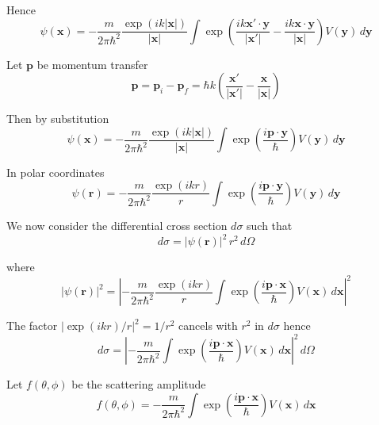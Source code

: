 Hence
\begin{equation*}
\psi(\mathbf x)=-\frac{m}{2\pi\hbar^2}\frac{\exp(ik|\mathbf x|)}{|\mathbf x|}
\int\exp\left(\frac{ik\mathbf x'\cdot\mathbf y}{|\mathbf x'|}
-\frac{ik\mathbf x\cdot\mathbf y}{|\mathbf x|}\right)
V(\mathbf y)\,d\mathbf y
\end{equation*}

Let $\mathbf p$ be momentum transfer
\begin{equation*}
\mathbf p=\mathbf p_i-\mathbf p_f
=\hbar k\left(\frac{\mathbf x'}{|\mathbf x'|}-\frac{\mathbf x}{|\mathbf x|}\right)
\end{equation*}

Then by substitution
\begin{equation*}
\psi(\mathbf x)=-\frac{m}{2\pi\hbar^2}\frac{\exp(ik|\mathbf x|)}{|\mathbf x|}
\int\exp\left(\frac{i\mathbf p\cdot\mathbf y}{\hbar}\right)
V(\mathbf y)\,d\mathbf y
\end{equation*}

In polar coordinates
\begin{equation*}
\psi(\mathbf r)=-\frac{m}{2\pi\hbar^2}\frac{\exp(ikr)}{r}
\int\exp\left(\frac{i\mathbf p\cdot\mathbf y}{\hbar}\right)
V(\mathbf y)\,d\mathbf y
\end{equation*}

We now consider the differential cross section $d\sigma$ such that
\begin{equation*}
d\sigma=|\psi(\mathbf r)|^2\,r^2\,d\Omega
\end{equation*}

where
\begin{equation*}
|\psi(\mathbf r)|^2=\left|-\frac{m}{2\pi\hbar^2}\frac{\exp(ikr)}{r}
\int\exp\left(\frac{i\mathbf p\cdot\mathbf x}{\hbar}\right)V(\mathbf x)\,d\mathbf x\right|^2
\end{equation*}

The factor $|\exp(ikr)/r|^2=1/r^2$ cancels with $r^2$ in $d\sigma$ hence
\begin{equation*}
d\sigma=\left|-\frac{m}{2\pi\hbar^2}
\int\exp\left(\frac{i\mathbf p\cdot\mathbf x}{\hbar}\right)V(\mathbf x)\,d\mathbf x\right|^2
\,d\Omega
\end{equation*}

Let $f(\theta,\phi)$ be the scattering amplitude
\begin{equation*}
f(\theta,\phi)=-\frac{m}{2\pi\hbar^2}
\int\exp\left(\frac{i\mathbf p\cdot\mathbf x}{\hbar}\right)V(\mathbf x)\,d\mathbf x
\end{equation*}

